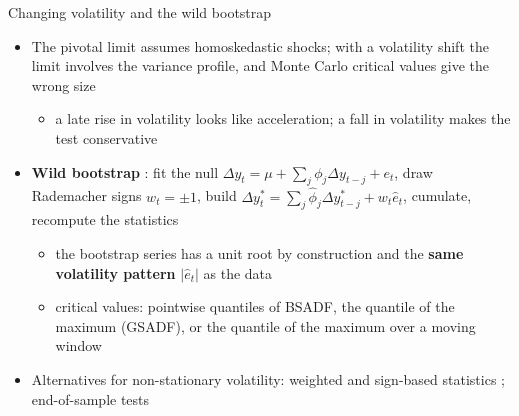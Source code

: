 \begin{frame}{Changing volatility and the wild bootstrap}
\itemsize{\small}
\begin{itemize}
    \item The pivotal limit assumes homoskedastic shocks; with a volatility shift the limit involves the variance profile, and Monte Carlo critical values give the wrong size 
    \begin{itemize}
        \item a late rise in volatility looks like acceleration; a fall in volatility makes the test conservative
    \end{itemize}
    \item \textbf{Wild bootstrap} : fit the null $\Delta y_t = \mu + \sum_j\phi_j\Delta y_{t-j} + e_t$, draw Rademacher signs $w_t = \pm 1$, build $\Delta y^*_t = \sum_j\hat\phi_j\Delta y^*_{t-j} + w_t\hat e_t$, cumulate, recompute the statistics
    \begin{itemize}
        \item the bootstrap series has a unit root by construction and the \textbf{same volatility pattern} $|\hat e_t|$ as the data
        \item critical values: pointwise quantiles of BSADF, the quantile of the maximum (GSADF), or the quantile of the maximum over a moving window
    \end{itemize}
    \item Alternatives for non-stationary volatility: weighted and sign-based statistics ; end-of-sample tests 
\end{itemize}
\end{frame}

